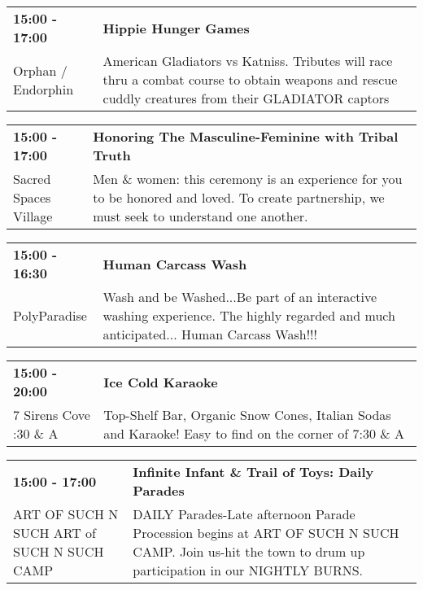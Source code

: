 \begin{tabular}{ p{1in} p{2.2in} }
    \textbf{15:00 - 17:00} & \textbf{Hippie Hunger Games} \\
    Orphan / Endorphin \newline  & American Gladiators vs Katniss. Tributes will race thru a combat course to obtain weapons and rescue cuddly creatures from their GLADIATOR captors \\
    \hline 
\end{tabular}
    
\begin{tabular}{ p{1in} p{2.2in} }
    \textbf{15:00 - 17:00} & \textbf{Honoring The Masculine-Feminine with Tribal Truth} \\
    Sacred Spaces Village \newline  & Men \& women: this ceremony is an experience for you to be honored and loved. To create partnership, we must seek to understand one another. \\
    \hline 
\end{tabular}
    
\begin{tabular}{ p{1in} p{2.2in} }
    \textbf{15:00 - 16:30} & \textbf{Human Carcass Wash} \\
    PolyParadise \newline  & Wash and be Washed...Be part of an interactive washing experience.
The highly regarded and much anticipated... Human Carcass Wash!!! \\
    \hline 
\end{tabular}
    
\begin{tabular}{ p{1in} p{2.2in} }
    \textbf{15:00 - 20:00} & \textbf{Ice Cold Karaoke} \\
    7 Sirens Cove \newline 7:30 \& A & Top-Shelf Bar, Organic Snow Cones, Italian Sodas and Karaoke! Easy to find on the corner of 7:30 \& A \\
    \hline 
\end{tabular}
    
\begin{tabular}{ p{1in} p{2.2in} }
    \textbf{15:00 - 17:00} & \textbf{Infinite Infant \& Trail of Toys: Daily Parades} \\
    ART OF SUCH N SUCH \newline ART of SUCH N SUCH CAMP & DAILY Parades-Late afternoon
Parade Procession begins at ART OF SUCH N SUCH CAMP. Join us-hit the town to drum up participation in our NIGHTLY BURNS. \\
    \hline 
\end{tabular}
    
